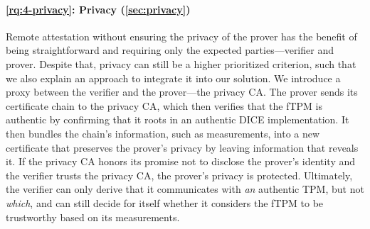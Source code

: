 \paragraph{\ref{rq:4-privacy}: Privacy (\autoref{sec:privacy})}
Remote attestation without ensuring the privacy of the prover has the benefit of being straightforward and requiring only the expected parties---verifier and prover.
Despite that, privacy can still be a higher prioritized criterion, such that we also explain an approach to integrate it into our solution.
We introduce a proxy between the verifier and the prover---the privacy CA\@.
The prover sends its certificate chain to the privacy CA, which then verifies that the \ac{fTPM} is authentic by confirming that it roots in an authentic DICE implementation.
It then bundles the chain's information, such as measurements, into a new certificate that preserves the prover's privacy by leaving information that reveals it.
If the privacy CA honors its promise not to disclose the prover's identity and the verifier trusts the privacy CA, the prover's privacy is protected.
Ultimately, the verifier can only derive that it communicates with \emph{an} authentic TPM, but not \emph{which}, and can still decide for itself whether it considers the \ac{fTPM} to be trustworthy based on its measurements.



